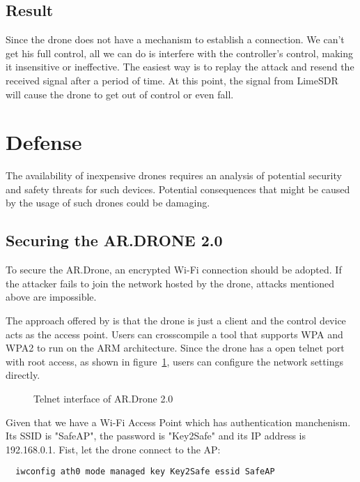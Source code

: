 \documentclass{acm_proc_article-sp}
\begin{document}
\subsection{Result}

Since the drone does not have a mechanism to establish a connection. We can't get his full control, all we can do is interfere with the controller's control, making it insensitive or ineffective. The easiest way is to replay the attack and resend the received signal after a period of time. At this point, the signal from LimeSDR will cause the drone to get out of control or even fall. 

\section{Defense}

The availability of inexpensive drones requires an analysis of potential security and safety threats for such devices. Potential consequences that might be caused by the usage of such drones could be damaging.

\subsection{Securing the AR.DRONE 2.0}

To secure the AR.Drone, an encrypted Wi-Fi connection should be adopted. If the attacker fails to join the network hosted by the drone, attacks mentioned above are impossible.

The approach offered by \cite{hack:secure} is that the drone is just a client and the control device acts as the access point. Users can crosscompile a tool that supports WPA and WPA2 to run on the ARM architecture. Since the drone has a open telnet port with root access, as shown in figure~\ref{telnet}, users can configure the network settings directly. 

\begin{figure}
\centering
{}
\caption{Telnet interface of AR.Drone 2.0}
\label{telnet}
\end{figure}


Given that we have a Wi-Fi Access Point which has authentication manchenism. Its SSID is "SafeAP", the password is "Key2Safe" and its IP address is 192.168.0.1. Fist, let the drone connect to the AP:
\begin{lstlisting}
  iwconfig ath0 mode managed key Key2Safe essid SafeAP
\end{lstlisting}
\end{document}
